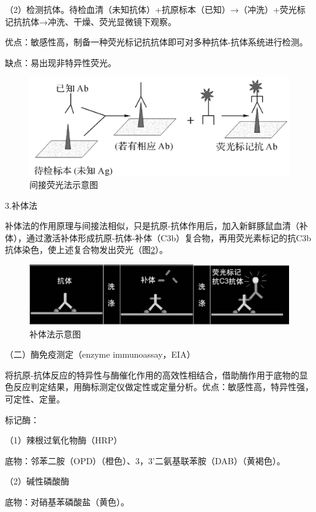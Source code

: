 （2）检测抗体。待检血清（未知抗体）+抗原标本（已知）→（冲洗）+荧光标记抗抗体→冲洗、干燥、荧光显微镜下观察。

优点：敏感性高，制备一种荧光标记抗抗体即可对多种抗体-抗体系统进行检测。

缺点：易出现非特异性荧光。

\begin{figure}[!htbp]
 \centering
 \includegraphics{./images/Image00166.jpg}
 \captionsetup{justification=centering}
 \caption{间接荧光法示意图}
 \label{fig10-14}
  \end{figure} 

3.补体法

补体法的作用原理与间接法相似，只是抗原-抗体作用后，加入新鲜豚鼠血清（补体），通过激活补体形成抗原-抗体-补体（C3b）复合物，再用荧光素标记的抗C3b抗体染色，使上述复合物发出荧光（图\ref{fig10-15}）。

\begin{figure}[!htbp]
 \centering
 \includegraphics[width=.6\textwidth]{./images/Image00167.jpg}
 \captionsetup{justification=centering}
 \caption{补体法示意图}
 \label{fig10-15}
  \end{figure} 

（二）酶免疫测定（enzyme immunoassay，EIA）

将抗原-抗体反应的特异性与酶催化作用的高效性相结合，借助酶作用于底物的显色反应判定结果，用酶标测定仪做定性或定量分析。优点：敏感性高，特异性强，可定性、定量。

标记酶：

（1）辣根过氧化物酶（HRP）

底物：邻苯二胺（OPD）（橙色）、3，3'二氨基联苯胺（DAB）（黄褐色）。

（2）碱性磷酸酶

底物：对硝基苯磷酸盐（黄色）。

